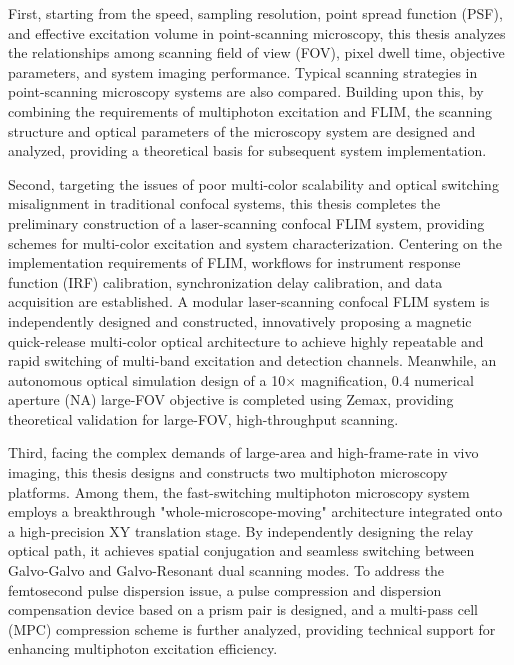 First, starting from the speed, sampling resolution, point spread function (PSF), and effective excitation volume in point-scanning microscopy, this thesis analyzes the relationships among scanning field of view (FOV), pixel dwell time, objective parameters, and system imaging performance. Typical scanning strategies in point-scanning microscopy systems are also compared. Building upon this, by combining the requirements of multiphoton excitation and FLIM, the scanning structure and optical parameters of the microscopy system are designed and analyzed, providing a theoretical basis for subsequent system implementation.

Second, targeting the issues of poor multi-color scalability and optical switching misalignment in traditional confocal systems, this thesis completes the preliminary construction of a laser-scanning confocal FLIM system, providing schemes for multi-color excitation and system characterization. Centering on the implementation requirements of FLIM, workflows for instrument response function (IRF) calibration, synchronization delay calibration, and data acquisition are established. A modular laser-scanning confocal FLIM system is independently designed and constructed, innovatively proposing a magnetic quick-release multi-color optical architecture to achieve highly repeatable and rapid switching of multi-band excitation and detection channels. Meanwhile, an autonomous optical simulation design of a 10$\times$ magnification, 0.4 numerical aperture (NA) large-FOV objective is completed using Zemax, providing theoretical validation for large-FOV, high-throughput scanning.

Third, facing the complex demands of large-area and high-frame-rate in vivo imaging, this thesis designs and constructs two multiphoton microscopy platforms. Among them, the fast-switching multiphoton microscopy system employs a breakthrough "whole-microscope-moving" architecture integrated onto a high-precision XY translation stage. By independently designing the relay optical path, it achieves spatial conjugation and seamless switching between Galvo-Galvo and Galvo-Resonant dual scanning modes. To address the femtosecond pulse dispersion issue, a pulse compression and dispersion compensation device based on a prism pair is designed, and a multi-pass cell (MPC) compression scheme is further analyzed, providing technical support for enhancing multiphoton excitation efficiency.

